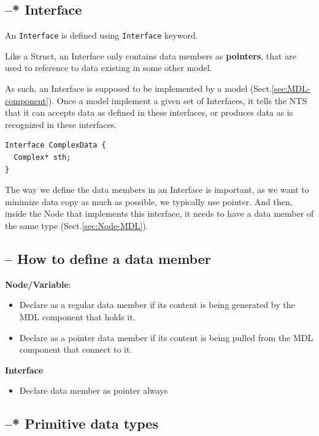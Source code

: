 \subsection{--* Interface}
\label{sec:MDL-Interface}

An \verb!Interface! is defined using \verb!Interface! keyword.

Like a Struct, an Interface only contains data members as {\bf pointers}, that
are used to reference to data existing in some other model.

As such, an Interface is supposed to be implemented by a model
(Sect.\ref{sec:MDL-component}). Once a model implement a given set of
Interfaces, it tells the NTS that it can accepts data as defined in these
interfaces, or produces data as is recognized in these interfaces.

\begin{verbatim}
Interface ComplexData {
  Complex* sth;
}
\end{verbatim}

The way we define the data members in an Interface is important, as we want to
minimize data copy as much as possible, we typically use pointer. And then,
inside the Node that implements this interface, it needs to have a data member
of the same type (Sect.\ref{sec:Node-MDL}).

\subsection{-- How to define a data member}

{\bf Node/Variable}:
\begin{itemize}
  \item Declare as a regular data member if its content is being generated by the MDL
component that holds it.

  \item Declare as a pointer data member if its content is being pulled from the
  MDL component that connect to it.
\end{itemize}

{\bf Interface}
\begin{itemize}
  \item Declare data member as pointer always
\end{itemize}


\subsection{--* Primitive data types}
\label{sec:MDL-data-types-primitive}

